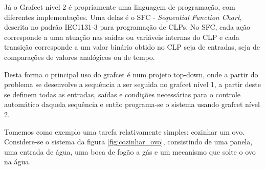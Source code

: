 Já o Grafcet nível 2 é propriamente uma linguagem de programação, com diferentes implementações. Uma delas é o SFC - \emph{Sequential Function Chart}, descrita no padrão IEC1131-3 para programação de CLPs. No SFC, cada ação corresponde a uma atuação nas saídas ou variáveis internas do CLP e cada transição corresponde a um valor binário obtido no CLP seja de entradas, seja de comparações de valores analógicos ou de tempo.

Desta forma o principal uso do grafcet é num projeto top-down, onde a partir do problema se desenvolve a sequência a ser seguida no grafcet nível 1, a partir deste se definem todas as entradas, saídas e condições necessárias para o controle automático daquela sequência e então programa-se o sistema usando grafcet nível 2.

Tomemos como exemplo uma tarefa relativamente simples: cozinhar um ovo. Considere-se o sistema da figura \ref{fig:cozinhar_ovo}, consistindo de uma panela, uma entrada de água, uma boca de fogão a gás e um mecanismo que solte o ovo na água.

